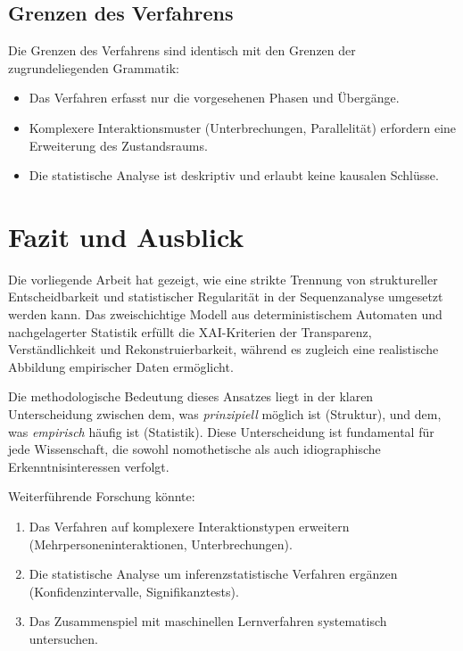 \documentclass[
  12pt,
  a4paper,
  oneside,
  titlepage
]{article}
\begin{document}
\subsection{Grenzen des Verfahrens}

Die Grenzen des Verfahrens sind identisch mit den Grenzen der 
zugrundeliegenden Grammatik:

\begin{itemize}
    \item Das Verfahren erfasst nur die vorgesehenen Phasen und 
    Übergänge.
    
    \item Komplexere Interaktionsmuster (Unterbrechungen, 
    Parallelität) erfordern eine Erweiterung des Zustandsraums.
    
    \item Die statistische Analyse ist deskriptiv und erlaubt keine 
    kausalen Schlüsse.
\end{itemize}

\section{Fazit und Ausblick}

Die vorliegende Arbeit hat gezeigt, wie eine strikte Trennung von 
struktureller Entscheidbarkeit und statistischer Regularität in der 
Sequenzanalyse umgesetzt werden kann. Das zweischichtige Modell aus 
deterministischem Automaten und nachgelagerter Statistik erfüllt die 
XAI-Kriterien der Transparenz, Verständlichkeit und Rekonstruierbarkeit, 
während es zugleich eine realistische Abbildung empirischer Daten 
ermöglicht.

Die methodologische Bedeutung dieses Ansatzes liegt in der klaren 
Unterscheidung zwischen dem, was \textit{prinzipiell} möglich ist 
(Struktur), und dem, was \textit{empirisch} häufig ist (Statistik). 
Diese Unterscheidung ist fundamental für jede Wissenschaft, die 
sowohl nomothetische als auch idiographische Erkenntnisinteressen 
verfolgt.

Weiterführende Forschung könnte:

\begin{enumerate}
    \item Das Verfahren auf komplexere Interaktionstypen erweitern 
    (Mehrpersoneninteraktionen, Unterbrechungen).
    
    \item Die statistische Analyse um inferenzstatistische Verfahren 
    ergänzen (Konfidenzintervalle, Signifikanztests).
    
    \item Das Zusammenspiel mit maschinellen Lernverfahren 
    systematisch untersuchen.
\end{enumerate}
\end{document}

